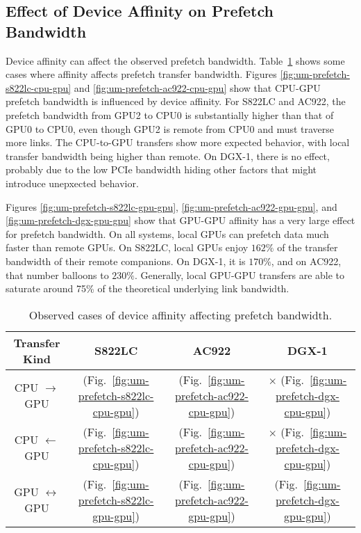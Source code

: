 \subsection{Effect of Device Affinity on Prefetch Bandwidth}

Device affinity can affect the observed prefetch bandwidth.
Table~\ref{tab:um-prefetch-affinity} shows some cases where affinity affects prefetch transfer bandwidth.
Figures \ref{fig:um-prefetch-s822lc-cpu-gpu} and \ref{fig:um-prefetch-ac922-cpu-gpu} show that CPU-GPU prefetch bandwidth is influenced by device affinity.
For S822LC and AC922, the prefetch bandwidth from GPU2 to CPU0 is substantially higher than that of GPU0 to CPU0, even though GPU2 is remote from CPU0 and must traverse more links.
The CPU-to-GPU transfers show more expected behavior, with local transfer bandwidth being higher than remote.
On DGX-1, there is no effect, probably due to the low PCIe bandwidth hiding other factors that might introduce unepxected behavior.

Figures \ref{fig:um-prefetch-s822lc-gpu-gpu}, \ref{fig:um-prefetch-ac922-gpu-gpu}, and \ref{fig:um-prefetch-dgx-gpu-gpu} show that GPU-GPU affinity has a very large effect for prefetch bandwidth.
On all systems, local GPUs can prefetch data much faster than remote GPUs.
On S822LC, local GPUs enjoy $162\%$ of the transfer bandwidth of their remote companions.
On DGX-1, it is $170\%$, and on AC922, that number balloons to $230\%$.
Generally, local GPU-GPU transfers are able to saturate around 75\% of the theoretical underlying link bandwidth.

\begin{table}[ht]
	\centering
	\caption[Device Affinity and prefetch Bandwidth]{
		Observed cases of device affinity affecting prefetch bandwidth.
	}
	\label{tab:um-prefetch-affinity}
	\begin{tabular}{|c|c|c|c|}
		\hline
		\textbf{Transfer Kind}    & \textbf{S822LC}                                        & \textbf{AC922}                                        & \textbf{DGX-1}                                      \\ \hline 
		CPU $\rightarrow$     GPU & \checkmark (Fig.~\ref{fig:um-prefetch-s822lc-cpu-gpu}) & \checkmark (Fig.~\ref{fig:um-prefetch-ac922-cpu-gpu}) & $\times$   (Fig.~\ref{fig:um-prefetch-dgx-cpu-gpu}) \\ \hline
		CPU $\leftarrow$      GPU & \checkmark (Fig.~\ref{fig:um-prefetch-s822lc-cpu-gpu}) & \checkmark (Fig.~\ref{fig:um-prefetch-ac922-cpu-gpu}) & $\times$   (Fig.~\ref{fig:um-prefetch-dgx-cpu-gpu}) \\ \hline
		GPU $\leftrightarrow$ GPU & \checkmark (Fig.~\ref{fig:um-prefetch-s822lc-gpu-gpu}) & \checkmark (Fig.~\ref{fig:um-prefetch-ac922-gpu-gpu}) & \checkmark (Fig.~\ref{fig:um-prefetch-dgx-gpu-gpu}) \\ \hline
	\end{tabular}
\end{table}


